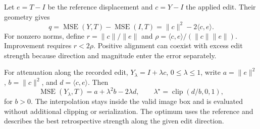 \documentclass[12pt]{article}
\newcommand{\MSE}{\operatorname{MSE}}
\newcommand{\clip}{\operatorname{clip}}
\begin{document}
Let $e=T-I$ be the reference displacement and $c=Y-I$ the applied edit. Their geometry gives
\begin{equation}
q=\MSE(Y,T)-\MSE(I,T)=\|c\|^2-2\langle c,e\rangle.\label{eq:correction-geometry}
\end{equation}
For nonzero norms, define $r=\|c\|/\|e\|$ and $\rho=\langle c,e\rangle/(\|c\|\|e\|)$. Improvement requires $r<2\rho$. Positive alignment can coexist with excess edit strength because direction and magnitude enter the error separately.

For attenuation along the recorded edit, $Y_\lambda=I+\lambda c$, $0\leq\lambda\leq1$, write $a=\|e\|^2$, $b=\|c\|^2$, and $d=\langle c,e\rangle$. Then
\begin{equation}
\MSE(Y_\lambda,T)=a+\lambda^2b-2\lambda d,\qquad
\lambda^\star=\clip(d/b,0,1),\label{eq:strength}
\end{equation}
for $b>0$. The interpolation stays inside the valid image box and is evaluated without additional clipping or serialization. The optimum uses the reference and describes the best retrospective strength along the given edit direction.
\end{document}

